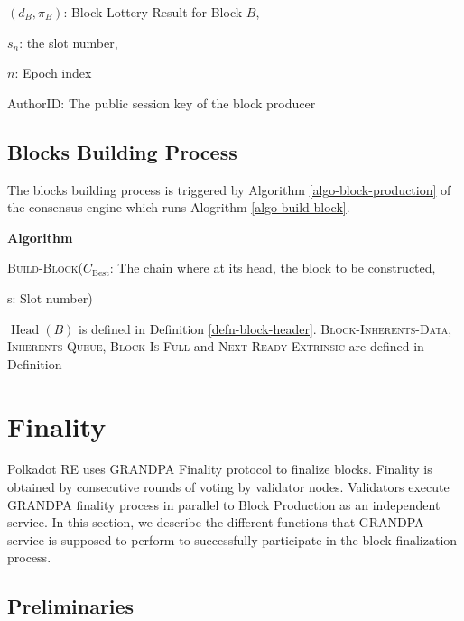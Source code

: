 \documentclass{book}
\newcommand{\tmname}[1]{\textsc{#1}}
\newcommand{\tmop}[1]{\ensuremath{\operatorname{#1}}}
\newcommand{\tmtextbf}[1]{{\bfseries{#1}}}
\newcommand{\tmtextup}[1]{{\upshape{#1}}}
\newenvironment{tmindent}{\begin{tmparmod}{1.5em}{0pt}{0pt}}{\end{tmparmod}}
\newenvironment{tmparmod}[3]{\begin{list}{}{\setlength{\topsep}{0pt}\setlength{\leftmargin}{#1}\setlength{\rightmargin}{#2}\setlength{\parindent}{#3}\setlength{\listparindent}{\parindent}\setlength{\itemindent}{\parindent}\setlength{\parsep}{\parskip}} \item[]}{\end{list}}
\newcounter{tmcounter}
\newcommand{\custombinding}[1]{%
  \setcounter{tmcounter}{#1}%
  \addtocounter{tmcounter}{-1}%
  \refstepcounter{tmcounter}}
\begin{document}
$(d_B, \pi_B)$: Block Lottery Result for Block $B$,

$s_n$: the slot number,

$n$: Epoch index

AuthorID: The public session key of the block producer

\subsection{Blocks Building Process}\label{sect-block-building}

The blocks building process is triggered by Algorithm
\ref{algo-block-production} of the consensus engine which runs Alogrithm
\ref{algo-build-block}.

\custombinding{13}{\noindent}\begin{tmparmod}{0pt}{0pt}{0em}%
    \tmtextbf{Algorithm \tmtextup{13}}{\smallskip}
    
    \begin{tmindent}
      \label{algo-build-block}{\tmname{Build-Block}}($C_{\tmop{Best}}$: The
      chain where at its head, the block to be constructed,
      
      s: Slot number)
    \end{tmindent}
\end{tmparmod}{\medskip}

$\tmop{Head} (B)$ is defined in Definition \ref{defn-block-header}.
{\tmname{Block-Inherents-Data}}, {\tmname{Inherents-Queue}},
{\tmname{Block-Is-Full}} and {\tmname{Next-Ready-Extrinsic}} are defined in
Definition {}

\section{Finality}\label{sect-finality}

Polkadot RE uses GRANDPA Finality protocol {\cite{stewart_grandpa:_2019}} to
finalize blocks. Finality is obtained by consecutive rounds of voting by
validator nodes. Validators execute GRANDPA finality process in parallel to
Block Production as an independent service. In this section, we describe the
different functions that GRANDPA service is supposed to perform to
successfully participate in the block finalization process.

\subsection{Preliminaries}
\end{document}
